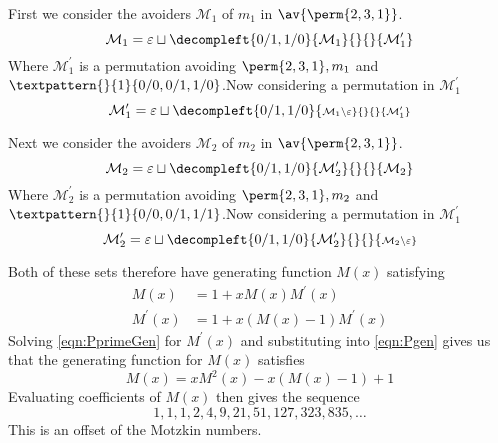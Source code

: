 \begin{frame}
  First we consider the avoiders \(\mathcal{M}_1\) of \(m_1\) in \(\av{\perm{2,3,1}}\).
  \begin{equation*}
    \mathcal{M}_1 = \varepsilon \sqcup
    \decompleft{0/1,1/0}{\mathcal{M}_1}{}{}{\mathcal{M}^\prime_1}
\end{equation*}
Where \(\mathcal{M}^\prime_1\) is a permutation avoiding \(\perm{2,3,1}, m_1\)
and \(\textpattern{}{1}{0/0,0/1,1/0}\).\pause Now considering a permutation in \(\mathcal{M}^\prime_1\)
\begin{equation*}
    \mathcal{M}^\prime_1 = \varepsilon \sqcup
    \decompleft{0/1,1/0}{\scriptstyle \mathcal{M}_1\setminus\varepsilon}{}{}{\mathcal{M}^\prime_1}
\end{equation*}
\end{frame}

\begin{frame}
  Next we consider the avoiders \(\mathcal{M}_2\) of \(m_2\) in \(\av{\perm{2,3,1}}\).
  \begin{equation*}
    \mathcal{M}_2 = \varepsilon \sqcup
    \decompleft{0/1,1/0}{\mathcal{M}^\prime_2}{}{}{\mathcal{M}_2}
\end{equation*}
Where \(\mathcal{M}^\prime_2\) is a permutation avoiding \(\perm{2,3,1}, m_2\)
and \(\textpattern{}{1}{0/0,0/1,1/1}\).\pause Now considering a permutation in \(\mathcal{M}^\prime_1\)
\begin{equation*}
    \mathcal{M}^\prime_2 = \varepsilon \sqcup
    \decompleft{0/1,1/0}{\mathcal{M}^\prime_2}{}{}{\scriptstyle \mathcal{M}_2\setminus\varepsilon}
\end{equation*}
\end{frame}
\begin{frame}
  Both of these sets therefore have generating function \(M(x)\) satisfying
  \begin{align}
    M(x) &= 1 + xM(x)M^\prime(x) \label{eqn:Pgen}\\
    M^\prime(x) &= 1 + x(M(x)-1)M^\prime(x)\label{eqn:PprimeGen}
 \end{align}\pause
 Solving \ref{eqn:PprimeGen} for \(M^\prime(x)\) and substituting into
\ref{eqn:Pgen} gives us that the generating function for
\(M(x)\) satisfies
\begin{equation}
    M(x) = xM^2(x) - x(M(x) - 1) + 1
\end{equation}\pause
Evaluating coefficients of \(M(x)\) then gives the sequence
\begin{equation*}
    1, 1, 1, 2, 4, 9, 21, 51, 127, 323, 835,\dotsc
\end{equation*}
This is an offset of the Motzkin numbers.
\end{frame}

